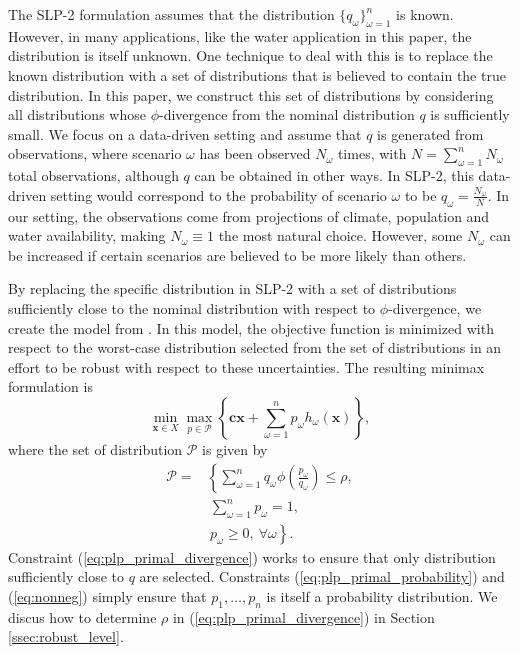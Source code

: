 \documentclass[opre,nonblindrev]{informs3} %
\newcommand{\x}{\mathbf{x}}
\renewcommand{\c}{\mathbf{c}}
\begin{document}
The SLP-2 formulation assumes that the distribution $\{q_\omega\}_{\omega=1}^n$ is known.
However, in many applications, like the water application in this paper, the distribution is itself unknown.
One technique to deal with this is to replace the known distribution with a set of distributions that is believed to contain the true distribution.
In this paper, we construct this set of distributions by considering all distributions whose $\phi$-divergence from the nominal distribution $q$ is sufficiently small.
We focus on a data-driven setting and assume that $q$ is generated from observations, where scenario $\omega$ has been observed $N_\omega$ times, with $N = \sum_{\omega=1}^n N_\omega$ total observations, although $q$ can be obtained in other ways.
In SLP-2, this data-driven setting would correspond to the probability of scenario $\omega$ to be $q_\omega = \frac{N_\omega}{N}$.
In our setting, the observations come from projections of climate, population and water availability, making $N_\omega \equiv 1$ the most natural choice.
However, some $N_\omega$ can be increased if certain scenarios are believed to be more likely than others.

By replacing the specific distribution in SLP-2 with a set of distributions sufficiently close to the nominal distribution with respect to $\phi$-divergence, we create the model from \citep{love2013phi}.
In this model, the objective function is minimized with respect to the worst-case distribution selected from the set of distributions in an effort to be robust with respect to these uncertainties.
The resulting minimax formulation is
\begin{equation}
	\min_{\x \in X} \max_{p \in \mathcal{P}} \left\{ \c\x + \sum_{\omega=1}^{n} p_\omega h_\omega(\x) \right\}, \label{eq:plp_primal}
\end{equation}
where the set of distribution $\mathcal{P}$ is given by
\begin{align}
	\mathcal{P} = & \left\{ \sum_{\omega = 1}^{n} q_\omega \phi\left(\frac{p_\omega}{q_\omega}\right) \leq \rho, \right. \label{eq:plp_primal_divergence} \\
	& \ \sum_{\omega=1}^{n} p_\omega = 1, \label{eq:plp_primal_probability} \\
	& \ \left. p_\omega \geq 0,\ \forall \omega \right\}. \label{eq:nonneg}
\end{align}
Constraint (\ref{eq:plp_primal_divergence}) works to ensure that only distribution sufficiently close to $q$ are selected.
Constraints (\ref{eq:plp_primal_probability}) and (\ref{eq:nonneg}) simply ensure that $p_1, \dots, p_n$ is itself a probability distribution.
We discus how to determine $\rho$ in (\ref{eq:plp_primal_divergence}) in Section \ref{ssec:robust_level}.
\end{document}
